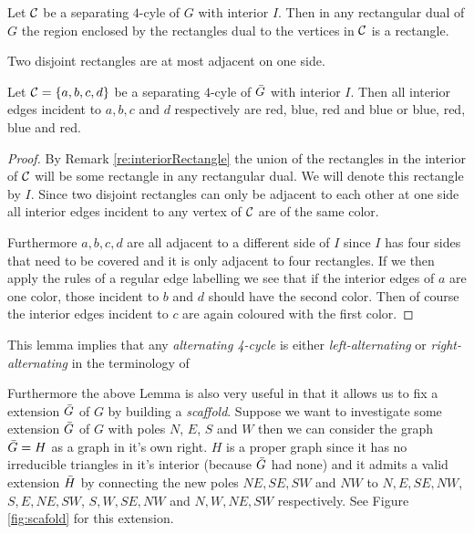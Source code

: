 \begin{remark}
\label{re:interiorRectangle}
Let $\mathcal{C}$ be a separating $4$-cyle of $G$ with interior $I$. Then in any rectangular dual of $G$ the region enclosed by the rectangles dual to the vertices in $\mathcal{C}$ is a rectangle.
\end{remark}

\begin{remark}
\label{re:disjointRectanglesOnlyHaveOneAdjecentSide}
Two disjoint rectangles are at most adjacent on one side.
\end{remark}

\begin{lemma}
\label{lem:fourCycleUnicolor}
Let $\mathcal{C} = \left\lbrace {a, b, c, d} \right\rbrace$ be a separating $4$-cyle of $\bar{G}$ with interior $I$. Then all interior edges incident to $a, b, c$ and $d$ respectively are red, blue, red and blue or blue, red, blue and red.
\end{lemma}

\begin{proof}
By Remark \ref{re:interiorRectangle} the union of the rectangles in the interior of $\mathcal{C}$ will be some rectangle in any rectangular dual. We will denote this rectangle by $I$. Since two disjoint rectangles can only be adjacent to each other at one side all interior edges incident to any vertex of $\mathcal{C}$ are of the same color. 

Furthermore $a, b, c, d$ are all adjacent to a different side of $I$ since $I$ has four sides that need to be covered and it is only adjacent to four rectangles. If we then apply the rules of a regular edge labelling we see that if the interior edges of $a$ are one color, those incident to $b$ and $d$ should have the second color. Then of course the interior edges incident to $c$ are again coloured with the first color. 

\end{proof}

This lemma implies that any \emph{alternating 4-cycle} %
is either \emph{left-alternating} or \emph{right-alternating} %
in the terminology of \Fusy

Furthermore the above Lemma is also very useful in that it allows us to fix a extension $\bar{G}$ of $G$ by building a \emph{scaffold}. Suppose we want to investigate some extension $\bar{G}$ of $G$ with poles $N$, $E$, $S$ and $W$ then we can consider the graph $\bar{G} = H$ as a graph in it's own right. $H$ is a proper graph since it has no irreducible triangles in it's interior (because $\bar{G}$ had none) and it admits a valid extension $\bar{H}$ by connecting the new poles $NE, SE, SW$ and $NW$ to $N, E, SE, NW$, $S, E, NE, SW$, $S, W, SE, NW$ and $N, W, NE, SW$ respectively. See Figure \ref{fig:scafold} for this extension.  

